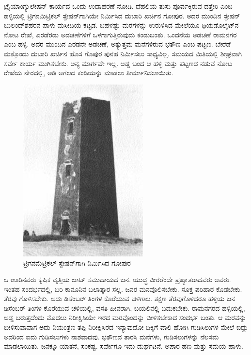 ಟ್ರೈಯಾಂಗ್ಯುಲೇಷನ್​ ಕಾರ್ಯದ ಒಂದು ಉದಾಹರಣೆ ನೋಡಿ. ದೆಹಲಿಯ ತುಸು ಪೂರ್ವಕ್ಕಿರುವ ದತ್ತೇರಿ ಎಂಬ ಹಳ್ಳಿಯಲ್ಲಿ ಟ್ರಿಗನಮಿಟ್ರಿಕಲ್​ ಸ್ಟೇಷನ್​ಗಾಗಿಯೇ ನಿರ್ಮಿಸಿದ ದುಬಾರಿ ಖರ್ಚಿನ ಗೋಪುರ. ಅದರ ಮುಂದಿನ ಸ್ಟೇಷನ್​ ಬುಲಂದ್​ಶಹರನ ಪಾಳು ಮಸೀದಿಯ ಕಟ್ಟಡ. ಬಹಳಷ್ಟು ಮರಗಳನ್ನು ಉರುಳಿಸಿದ ಮೇಲೆಯೂ ಥಿಯಡೊಲೈಟ್​ನ ನೋಟ ರೇಖೆ, ಎರಡೆರಡು ಅಡಚಣೆಗಳಿಗೆ ಒಳಗಾಗುತ್ತಿರುವುದು ಕಂಡುಬಂತು. ಒಂದನೆಯ ಅಡಚಣೆ ರಾಮನಗರ ಎಂಬ ಹಳ್ಳಿ. ಅದರ ಮುಂದಿನ ಎರಡನೇ ಅಡಚಣೆ, ಅತ್ಯುತ್ತಮ ಮನೆಗಳಿರುವ ಭತೌಣ ಎಂಬ ಪಟ್ಟಣ. ಬೇರೆಡೆ ಮತ್ತೊಂದು ದುಬಾರಿ ಖರ್ಚಿನ ಹೊಸ ಗೊಪುರ ಪುನಹ ನಿರ್ಮಿಸಲು ಸಾಧ್ಯವಿಲ್ಲ. ಸಮಯದ ಮಿತಿಯಲ್ಲಿ ಶೀಘ್ರವಾಗಿ ಸರ್ವೇ ಕಾರ್ಯ ಮುಗಿಸಬೇಕು. ಅನ್ಯ ಮಾರ್ಗವೇ ಇಲ್ಲ. ಅಡ್ಡ ಬಂದ ಆ ಹಳ್ಳಿ ಮತ್ತು ಪಟ್ಟಣದ ನಡುವೆ ನೋಟ ರೇಖೆಯ ನೇರದಲ್ಲಿ,  ಅಡಿ ಅಗಲದ ಕಂಡಿಯನ್ನು ಮಾಡಲು ತೀರ್ಮಾನಿಸಲಾಯಿತು.

\newpage

\begin{figure}[!htbp]
\includegraphics[scale=1.05]{"images/image015.jpg"}
\caption{ಟ್ರಿಗನಮೆಟ್ರಿಕಲ್ ಸ್ಟೇಷನ್‌ಗಾಗಿ ನಿರ್ಮಿಸಿದ ಗೋಪುರ}\label{chap12-fig1}
\end{figure}

\vskip 4pt

ಆ ಊರಿನವರು ಕೃಷಿಕ ವೃತ್ತಿಯ ಜಾಟ್​ ಸಮುದಾಯದ ಜನ. ಯುದ್ಧ ವೀರರೆಂದೇ ಪ್ರಖ್ಯಾತರಾದವರು ಅವರು. ಇಂತಹ ಸಂದರ್ಭದಲ್ಲಿ, ಬರಿ ಕಾನೂನಿನ ಬಲಾತ್ಕಾರ ಸಲ್ಲ. ಜನರ ಮನವೊಲಿಸಬೇಕು. ಸೂಕ್ತ ಪರಿಹಾರ ಕೊಡಬೇಕು. ತೆರವು ಗೊಳಿಸಬೇಕು. ಅದು ಡಿಸೆಂಬರ್​ ತಿಂಗಳ ಕೊರೆಯುವ ಚಳಿಗಾಲ. ತಕ್ಷಣ ತೆರವುಗೊಳಿದರೂ ಹಳ್ಳಿಯ ಜನ ಡಿಸೆಂಬರ್​ ತಿಂಗಳ ಕೊರೆಯುವ ಚಳಿಯಲ್ಲಿ, ವಸತಿ ಹೀನರಾಗಿ, ಬಯಲಿನಲ್ಲಿ ಬದುಕಬೇಕು. ರಾಮನಗರದ ಹಳ್ಳಿಯಲ್ಲಿ, ಅಡ್ಡ ಬರುತ್ತದೆಂದು ಮೊದಲು ನಿರೀಕ್ಷಿಸಿಯೇ ಇರದ ಮರವೊಂದನ್ನು ಬೀಳಿಸಬೇಕಾದ ಸಂದರ್ಭ ಬಂತು. ಆ ಮರವನ್ನು ಬೀಳಿಸುವಾವಾಗ ಅದು ನಿಯಂತ್ರಣ ತಪ್ಪಿ ನಿರೀಕ್ಷಿಸಿರದ ಇನ್ಯಾವುದೋ ದಿಕ್ಕಿಗೆ ವಾಲಿ ಹೋಗಿ ಗುಡಿಸಿಲುಗಳ ಮೇಲೆ ಬಿದ್ದು ಅದರಿಂದ ಐದು ಗುಡಿಸಲುಗಳು ನಾಶವಾದವು. ಭತೌಣದ  ತಾರಸಿ ಮನೆಗಳು,  ಗುಡಿಸಲುಗಳನ್ನು ನೆಲಸಮ ಮಾಡಲಾಯಿತು. ಜನಕ್ಕೂ ಯಾತನೆ, ಸಂಕಷ್ಟ. ಸರ್ವೇಗೂ ಇದು ದುರ್ಘಟನೆ. ಅಪಾರ ಹಣ ಮತ್ತು ಸಮಯ ಹಾಳು.

